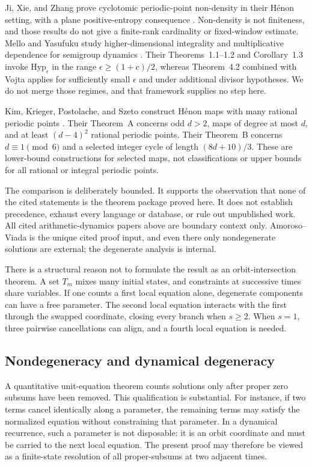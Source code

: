 \documentclass[11pt]{article}
\theoremstyle{definition}
\begin{document}
Ji, Xie, and Zhang prove cyclotomic periodic-point non-density in their Hénon setting, with a plane positive-entropy consequence \cite[Theorem~1.8 and Corollary~1.9]{jiXieZhang2026}. Non-density is not finiteness, and those results do not give a finite-rank cardinality or fixed-window estimate. Mello and Yasufuku study higher-dimensional integrality and multiplicative dependence for semigroup dynamics \cite{melloYasufuku2026}. Their Theorems~1.1--1.2 and Corollary~1.3 invoke \(\mathrm{Hyp}_{\epsilon}\) in the range \(\epsilon\geq(1+c)/2\), whereas Theorem~4.2 combined with Vojta applies for sufficiently small \(\epsilon\) and under additional divisor hypotheses. We do not merge those regimes, and that framework supplies no step here.

Kim, Krieger, Postolache, and Szeto construct Hénon maps with many rational periodic points \cite{kimEtAl2025}. Their Theorem~A concerns odd \(d>2\), maps of degree at most \(d\), and at least \((d-4)^2\) rational periodic points. Their Theorem~B concerns \(d\equiv1\pmod6\) and a selected integer cycle of length \((8d+10)/3\). These are lower-bound constructions for selected maps, not classifications or upper bounds for all rational or integral periodic points.

The comparison is deliberately bounded. It supports the observation that none of the cited statements is the theorem package proved here. It does not establish precedence, exhaust every language or database, or rule out unpublished work. All cited arithmetic-dynamics papers above are boundary context only. Amoroso--Viada is the unique cited proof input, and even there only nondegenerate solutions are external; the degenerate analysis is internal.

There is a structural reason not to formulate the result as an orbit-intersection theorem. A set \(T_m\) mixes many initial states, and constraints at successive times share variables. If one counts a first local equation alone, degenerate components can have a free parameter. The second local equation interacts with the first through the swapped coordinate, closing every branch when \(s\geq2\). When \(s=1\), three pairwise cancellations can align, and a fourth local equation is needed.


\subsection{Nondegeneracy and dynamical degeneracy}

A quantitative unit-equation theorem counts solutions only after proper zero subsums have been removed. This qualification is substantial. For instance, if two terms cancel identically along a parameter, the remaining terms may satisfy the normalized equation without constraining that parameter. In a dynamical recurrence, such a parameter is not disposable: it is an orbit coordinate and must be carried to the next local equation. The present proof may therefore be viewed as a finite-state resolution of all proper-subsums at two adjacent times.
\end{document}
